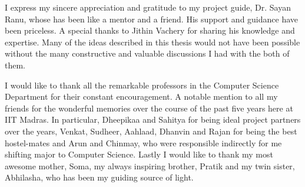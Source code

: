 I express my sincere appreciation and gratitude to my project guide, Dr. Sayan Ranu, whose has been like a mentor and a friend. His support and guidance have been priceless. A special thanks to Jithin Vachery for sharing his knowledge and expertise. Many of the ideas described in this thesis would not have been possible without the many constructive and valuable discussions I had with the both of them.

I would like to thank all the remarkable professors in the Computer Science Department for their constant encouragement. A notable mention to all my friends for the wonderful memories over the course of the past five years here at IIT Madras. In particular, Dheepikaa and Sahitya for being ideal project partners over the years, Venkat, Sudheer, Aahlaad, Dhanvin and Rajan for being the best hostel-mates and Arun and Chinmay, who were responsible indirectly for me shifting major to Computer Science. Lastly I would like to thank my most awesome mother, Soma, my always inspiring brother, Pratik and my twin sister, Abhilasha, who has been my guiding source of light.
      